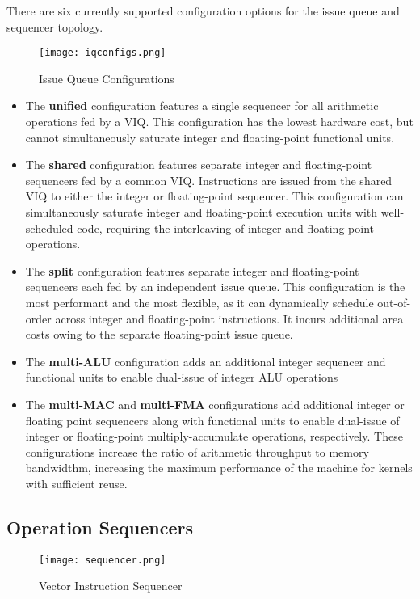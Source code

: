 There are six currently supported configuration options for the issue queue and sequencer topology.

\begin{figure}[h]
  \centering
  \texttt{[image: iqconfigs.png]}
  \caption{Issue Queue Configurations}
  \label{fig:iqs}
\end{figure}

\begin{itemize}
\item The \textbf{unified} configuration features a single sequencer for all arithmetic operations fed by a VIQ. This configuration has the lowest hardware cost, but cannot simultaneously saturate integer and floating-point functional units.
\item The \textbf{shared} configuration features separate integer and floating-point sequencers fed by a common VIQ.
 Instructions are issued from the shared VIQ to either the integer or floating-point sequencer.
 This configuration can simultaneously saturate integer and floating-point execution units with well-scheduled code, requiring the interleaving of integer and floating-point operations.
\item The \textbf{split} configuration features separate integer and floating-point sequencers each fed by an independent issue queue. This configuration is the most performant and the most flexible, as it can dynamically schedule out-of-order across integer and floating-point instructions. It incurs additional area costs owing to the separate floating-point issue queue.
\item The \textbf{multi-ALU} configuration adds an additional integer sequencer and functional units to enable dual-issue of integer ALU operations
\item The \textbf{multi-MAC} and \textbf{multi-FMA} configurations add additional integer or floating point sequencers along with functional units to enable dual-issue of integer or floating-point multiply-accumulate operations, respectively. These configurations increase the ratio of arithmetic throughput to memory bandwidthm, increasing the maximum performance of the machine for kernels with sufficient reuse.
 \end{itemize}

\subsection{Operation Sequencers}

\begin{figure}[h]
  \centering
  \texttt{[image: sequencer.png]}
  \caption{Vector Instruction Sequencer}
  \label{fig:seq}
\end{figure}

